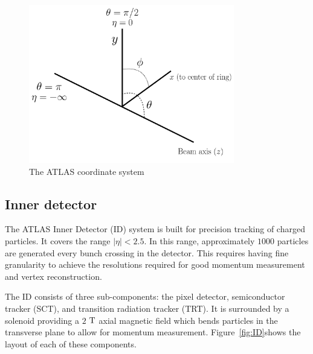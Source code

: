 \begin{figure}[h!]
  \centering
  \captionsetup{justification=centering}

  \includegraphics[width=0.8\textwidth]{figures/ATLAS_coord}
   \caption{The ATLAS coordinate system}
  \label{fig:coord}
\end{figure}

\subsection{Inner detector}

The ATLAS Inner Detector (ID) system is built for precision tracking of charged particles. It covers the range $|\eta| < 2.5$. In this range, approximately $1000$ particles are generated every bunch crossing in the detector. This requires having fine granularity to achieve the resolutions required for good momentum measurement and vertex reconstruction. 

The ID consists of three sub-components: the pixel detector, semiconductor tracker (SCT), and transition radiation tracker (TRT). It is surrounded by a solenoid providing a $2$ $\rm T$ axial magnetic field which bends particles in the transverse plane to allow for momentum measurement. Figure~\ref{fig:ID}shows the layout of each of these components. 

